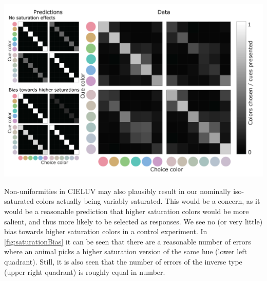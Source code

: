 \begin{center}
    \includegraphics[width=\textwidth]{../Figures/working/Old-General/6_SaturationBias_1.jpg}
    \label{fig:saturationBias}
\end{center}

Non-uniformities in CIELUV may also plausibly result in our nominally iso-saturated colors actually being variably saturated. This would be a concern, as it would be a reasonable prediction that higher saturation colors would be more salient, and thus more likely to be selected as responses. We see no (or very little) bias towards higher saturation colors in a control experiment. In \autoref{fig:saturationBias} it can be seen that there are a reasonable number of errors where an animal picks a higher saturation version of the same hue (lower left quadrant). Still, it is also seen that the number of errors of the inverse type (upper right quadrant) is roughly equal in number.

